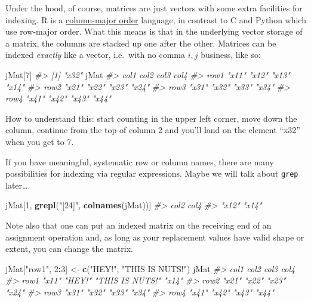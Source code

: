 \documentclass[
]{book}
\newenvironment{Shaded}{\begin{snugshade}}{\end{snugshade}}
\newcommand{\CommentTok}[1]{\textcolor[rgb]{0.56,0.35,0.01}{\textit{#1}}}
\newcommand{\DecValTok}[1]{\textcolor[rgb]{0.00,0.00,0.81}{#1}}
\newcommand{\KeywordTok}[1]{\textcolor[rgb]{0.13,0.29,0.53}{\textbf{#1}}}
\newcommand{\NormalTok}[1]{#1}
\newcommand{\OperatorTok}[1]{\textcolor[rgb]{0.81,0.36,0.00}{\textbf{#1}}}
\newcommand{\StringTok}[1]{\textcolor[rgb]{0.31,0.60,0.02}{#1}}
\begin{document}
Under the hood, of course, matrices are just vectors with some extra facilities for indexing. R is a \href{https://en.wikipedia.org/wiki/Row-_and_column-major_order}{column-major order} language, in contrast to C and Python which use row-major order. What this means is that in the underlying vector storage of a matrix, the columns are stacked up one after the other. Matrices can be indexed \emph{exactly} like a vector, i.e.~with no comma \(i,j\) business, like so:

\begin{Shaded}
\begin{Highlighting}[]
\NormalTok{jMat[}\DecValTok{7}\NormalTok{]}
\CommentTok{#> [1] "x32"}
\NormalTok{jMat}
\CommentTok{#>      col1  col2  col3  col4 }
\CommentTok{#> row1 "x11" "x12" "x13" "x14"}
\CommentTok{#> row2 "x21" "x22" "x23" "x24"}
\CommentTok{#> row3 "x31" "x32" "x33" "x34"}
\CommentTok{#> row4 "x41" "x42" "x43" "x44"}
\end{Highlighting}
\end{Shaded}

How to understand this: start counting in the upper left corner, move down the column, continue from the top of column 2 and you'll land on the element ``x32'' when you get to 7.

If you have meaningful, systematic row or column names, there are many possibilities for indexing via regular expressions. Maybe we will talk about \texttt{grep} later\ldots.

\begin{Shaded}
\begin{Highlighting}[]
\NormalTok{jMat[}\DecValTok{1}\NormalTok{, }\KeywordTok{grepl}\NormalTok{(}\StringTok{"[24]"}\NormalTok{, }\KeywordTok{colnames}\NormalTok{(jMat))]}
\CommentTok{#>  col2  col4 }
\CommentTok{#> "x12" "x14"}
\end{Highlighting}
\end{Shaded}

Note also that one can put an indexed matrix on the receiving end of an assignment operation and, as long as your replacement values have valid shape or extent, you can change the matrix.

\begin{Shaded}
\begin{Highlighting}[]
\NormalTok{jMat[}\StringTok{"row1"}\NormalTok{, }\DecValTok{2}\OperatorTok{:}\DecValTok{3}\NormalTok{] <-}\StringTok{ }\KeywordTok{c}\NormalTok{(}\StringTok{"HEY!"}\NormalTok{, }\StringTok{"THIS IS NUTS!"}\NormalTok{)}
\NormalTok{jMat}
\CommentTok{#>      col1  col2   col3            col4 }
\CommentTok{#> row1 "x11" "HEY!" "THIS IS NUTS!" "x14"}
\CommentTok{#> row2 "x21" "x22"  "x23"           "x24"}
\CommentTok{#> row3 "x31" "x32"  "x33"           "x34"}
\CommentTok{#> row4 "x41" "x42"  "x43"           "x44"}
\end{Highlighting}
\end{Shaded}
\end{document}
